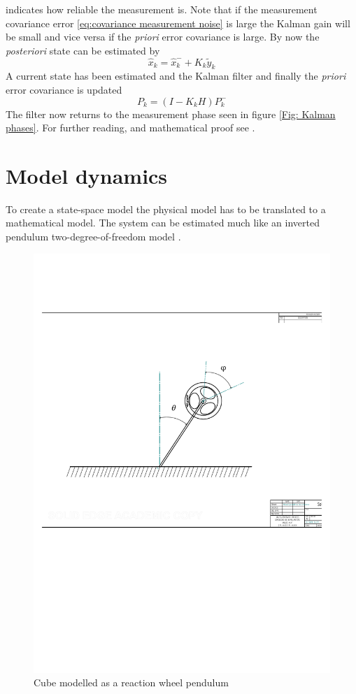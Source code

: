 \documentclass[a4paper,11pt]{kth-mag}
\begin{document}
indicates how reliable the measurement is. Note that if the measurement covariance error \eqref{eq:covariance measurement noise} is large the Kalman gain will be small and vice versa if the \textit{priori} error covariance is large.
By now the \textit{posteriori} state can be estimated by
\begin{equation}
\hat{x}_k = \hat{x}^-_k + K_k\tilde{y}_k
\end{equation}
A current state has been estimated and the Kalman filter and finally the \textit{priori} error covariance is updated
\begin{equation}
P_k=(I-K_kH)P^-_k
\end{equation} 
The filter now returns to the measurement phase seen in figure \ref{Fig: Kalman phases}.
For further reading, and mathematical proof see \cite{Kalmanintro}.

\section{Model dynamics} \label{chapter: state space}
To create a state-space model the physical model has to be translated to a mathematical model. The system can be estimated much like an inverted pendulum two-degree-of-freedom model \cite{KTHpendulum}.
\begin{figure}[!htb]
\centering
\includegraphics[scale=.6]{Lagrangeflywheel.pdf}
\caption{Cube modelled as a reaction wheel pendulum}
\label{fig:Lagrangeflywheel}
\end{figure}
\end{document}
